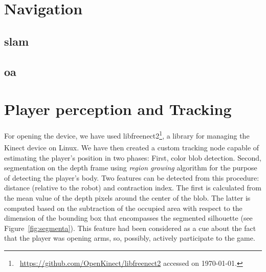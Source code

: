 \section{Navigation}
\subsection{\glsdesc{slam}}
\subsection{\glsdesc{oa}}

\section{Player perception and Tracking}
For opening the device, we have used libfreenect2\footnote{~\url{https://github.com/OpenKinect/libfreenect2} accessed on \today.}, a library for managing the Kinect\textsuperscript{\textregistered} device on Linux. We have then created a custom tracking node capable of estimating the player's position in two phases: First, color blob detection. Second, segmentation on the depth frame using \textit{region growing} algorithm for the purpose of detecting the player's body. Two features can be detected from this procedure: distance (relative to the robot) and contraction index. The first is calculated from the mean value of the depth pixels around the center of the blob. The latter is computed based on the subtraction of the occupied area with respect to the dimension of the bounding box that encompasses the segmented silhouette (see Figure~\ref{fig:segmenta}). This feature had been considered as a cue about the fact that the player was opening arms, so, possibly, actively participate to the game.

